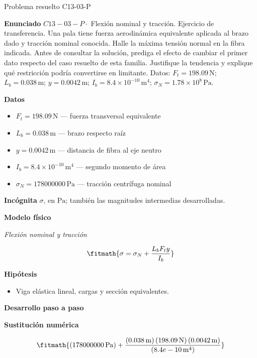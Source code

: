 \documentclass[10pt,openany]{book}
\begin{document}
\begin{studiumworked}{Problema resuelto C13-03-P}


\noindent\textbf{Enunciado}
\(C13-03-P \cdot\) Flexión nominal y tracción. Ejercicio de transferencia. Una pala tiene fuerza aerodinámica equivalente aplicada al brazo dado y tracción nominal conocida. Halle la máxima tensión normal en la fibra indicada. Antes de consultar la solución, prediga el efecto de cambiar el primer dato respecto del caso resuelto de esta familia. Justifique la tendencia y explique qué restricción podría convertirse en limitante. Datos: \(F_t=198.09\, \mathrm{N}\); \(L_b=0.038\, \mathrm{m}\); \(y=0.0042\, \mathrm{m}\); \(I_b=8.4\times 10^{-10}\, \mathrm{m}^{4}\); \(\sigma_N=1.78\times 10^{8}\, \mathrm{Pa}\).

\noindent\textbf{Datos}
\begin{itemize}
\item $F_t = 198.09\,\mathrm{N}$ — fuerza transversal equivalente
\item $L_b = 0.038\,\mathrm{m}$ — brazo respecto raíz
\item $y = 0.0042\,\mathrm{m}$ — distancia de fibra al eje neutro
\item $I_b = 8.4\times 10^{-10}\,\mathrm{m}^{4}$ — segundo momento de área
\item $\sigma_N = 178000000\,\mathrm{Pa}$ — tracción centrífuga nominal
\end{itemize}

\noindent\textbf{Incógnita}
$\sigma$, en $\mathrm{Pa}$; también las magnitudes intermedias desarrolladas.

\noindent\textbf{Modelo físico}

\noindent\textit{Flexión nominal y tracción}

\[
\fitmath{\sigma=\sigma_N + \frac{L_b F_t y}{I_b}}
\]

\noindent\textbf{Hipótesis}
\begin{itemize}
\item Viga elástica lineal, cargas y sección equivalentes.
\end{itemize}

\noindent\textbf{Desarrollo paso a paso}



\noindent\textbf{Sustitución numérica}

\[
\fitmath{\left(178000000\,\mathrm{Pa}\right) + \frac{\left(0.038\,\mathrm{m}\right) \left(198.09\,\mathrm{N}\right) \left(0.0042\,\mathrm{m}\right)}{\left(8.4e-10\,\mathrm{m}^{4}\right)}}
\]


\end{studiumworked}
\end{document}

